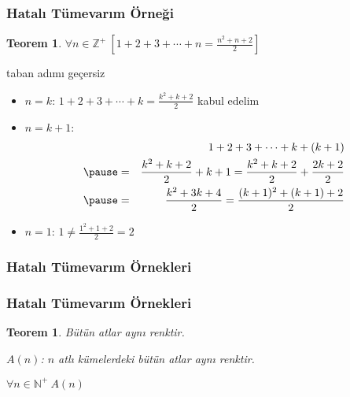 \documentclass[dvipsnames]{beamer}
\theoremstyle{definition}
\theoremstyle{example}
\theoremstyle{plain}
\newtheorem{teorem}[theorem]{Teorem}
\begin{document}
\begin{frame}
  \frametitle{Hatalı Tümevarım Örneği}

  \begin{teorem}
    $\forall n \in \mathbb{Z}^+~[1+2+3+\cdots+n=\frac{n^2+n+2}{2}]$
  \end{teorem}

  \pause
  \begin{block}{taban adımı geçersiz}
    \begin{itemize}
      \item $n=k$: $1+2+3+\cdots+k=\frac{k^2+k+2}{2}$ kabul edelim

      \pause
      \item $n=k+1$:
      \begin{eqnarray*}
        &   & 1+2+3+\cdots+k+(k+1)\\\pause
        & = & \frac{k^2+k+2}{2}+k+1
          =   \frac{k^2+k+2}{2}+\frac{2k+2}{2}\\\pause
        & = & \frac{k^2+3k+4}{2}
          =   \frac{(k+1)^2+(k+1)+2}{2}
      \end{eqnarray*}

      \pause
      \item $n=1$: $1 \neq \frac{1^2+1+2}{2}=2$
    \end{itemize}
  \end{block}
\end{frame}

\begin{frame}
  \frametitle{Hatalı Tümevarım Örnekleri}

  \begin{center}
  \end{center}
\end{frame}

\begin{frame}
  \frametitle{Hatalı Tümevarım Örnekleri}

  \begin{teorem}
    Bütün atlar aynı renktir.

    \pause
    \bigskip
    $A(n)$: $n$ atlı kümelerdeki bütün atlar aynı renktir.

    \medskip
    $\forall n \in \mathbb{N^+}~A(n)$
  \end{teorem}
\end{frame}
\end{document}
